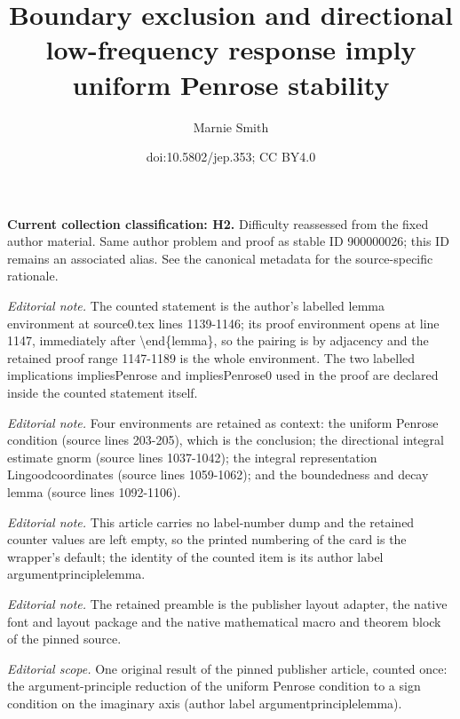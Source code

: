 \documentclass[10pt,a4paper]{article}
\title{Boundary exclusion and directional low-frequency response imply uniform Penrose stability}
\author{Marnie Smith}
\date{doi:10.5802/jep.353; CC BY4.0}
\theoremstyle{plain}
\theoremstyle{remark}
\begin{document}
\maketitle
\par\medskip\noindent\textbf{Current collection classification: H2.} Difficulty reassessed from the fixed author material. Same author problem and proof as stable ID 900000026; this ID remains an associated alias. See the canonical metadata for the source-specific rationale.\par\medskip

\noindent\textit{Editorial note.} The counted statement is the author's labelled lemma environment at source0.tex lines 1139-1146; its proof environment opens at line 1147, immediately after \textbackslash{}end\{lemma\}, so the pairing is by adjacency and the retained proof range 1147-1189 is the whole environment. The two labelled implications impliesPenrose and impliesPenrose0 used in the proof are declared inside the counted statement itself.\par\medskip
\noindent\textit{Editorial note.} Four environments are retained as context: the uniform Penrose condition (source lines 203-205), which is the conclusion; the directional integral estimate gnorm (source lines 1037-1042); the integral representation Lingoodcoordinates (source lines 1059-1062); and the boundedness and decay lemma (source lines 1092-1106).\par\medskip
\noindent\textit{Editorial note.} This article carries no label-number dump and the retained counter values are left empty, so the printed numbering of the card is the wrapper's default; the identity of the counted item is its author label argumentprinciplelemma.\par\medskip
\noindent\textit{Editorial note.} The retained preamble is the publisher layout adapter, the native font and layout package and the native mathematical macro and theorem block of the pinned source.\par\medskip
\noindent\textit{Editorial scope.} One original result of the pinned publisher article, counted once: the argument-principle reduction of the uniform Penrose condition to a sign condition on the imaginary axis (author label argumentprinciplelemma).\par\medskip
\end{document}
